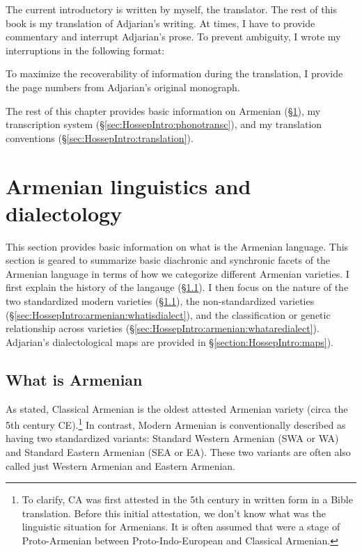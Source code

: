 The current introductory is written by myself, the translator. The rest of this book is my translation of Adjarian's writing. At times, I have to provide commentary and interrupt Adjarian's prose. To prevent ambiguity, I wrote my interruptions in the following format:

\begin{center}
\end{center}

To maximize the recoverability of information during the translation, I provide the page numbers from Adjarian's original monograph. 

The rest of this chapter provides basic information on Armenian (\S\ref{sec:HossepIntro:armenian}), my transcription system (\S\ref{sec:HossepIntro:phonotransc}),   and my translation conventions (\S\ref{sec:HossepIntro:translation}).



\section{Armenian linguistics and dialectology}\label{sec:HossepIntro:armenian}


This section provides basic information on what is the Armenian language. This section is geared to summarize basic diachronic and synchronic facets of the Armenian language in terms of how we categorize different Armenian varieties. I first explain the history of the langauge (\S\ref{sec:HossepIntro:armenian:whatisarm}). I then focus on the nature of the two standardized modern varieties  (\S\ref{sec:HossepIntro:armenian:whatisarm}), the non-standardized varieties (\S\ref{sec:HossepIntro:armenian:whatisdialect}), and the classification or genetic relationship across   varieties (\S\ref{sec:HossepIntro:armenian:whataredialect}). Adjarian's dialectological maps are provided in \S\ref{section:HossepIntro:maps}).  
\subsection{What is Armenian}\label{sec:HossepIntro:armenian:whatisarm}

As stated, Classical Armenian is the oldest attested Armenian variety (circa the 5th century CE).\footnote{To clarify, CA was first attested in the 5th century in written form in a Bible translation. Before this initial attestation, we don't know what was the linguistic situation for Armenians. It is often assumed that were a stage of Proto-Armenian between Proto-Indo-European and Classical Armenian. } In contrast, Modern Armenian is conventionally described as having two standardized variants: Standard Western Armenian (SWA or WA) and Standard Eastern Armenian (SEA or EA). These two variants are often also called just Western Armenian and Eastern Armenian. 


